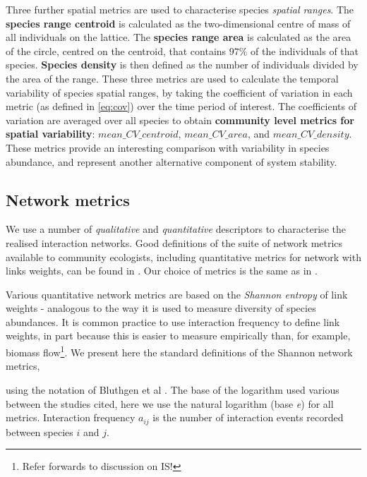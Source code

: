 Three further spatial metrics are used to characterise species \emph{spatial ranges}. The \textbf{species range centroid} is calculated as the two-dimensional centre of mass of all individuals on the lattice. The \textbf{species range area} is calculated as the area of the circle, centred on the centroid, that contains $97\%$ of the individuals of that species. \textbf{Species density} is then defined as the number of individuals divided by the area of the range. These three metrics are used to calculate the temporal variability of species spatial ranges, by taking the coefficient of variation in each metric (as defined in \eqref{eq:cov}) over the time period of interest. The coefficients of variation are averaged over all species to obtain \textbf{community level metrics for spatial variability}: $mean\_CV\_centroid$, $mean\_CV\_area$, and $mean\_CV\_density$. These metrics provide an interesting comparison with variability in species abundance, and represent another alternative component of system stability.


\subsection{Network metrics}
\label{sec:define_network_metrics}

We use a number of \emph{qualitative} and \emph{quantitative} descriptors to characterise the realised interaction networks. Good definitions of the suite of network metrics available to community ecologists, including quantitative metrics for network with links weights, can be found in \cite{}. Our choice of metrics is the same as in \cite{lurgi2015effects}.


Various quantitative network metrics are based on the \emph{Shannon entropy} of link weights - analogous to the way it is used to measure diversity of species abundances. It is common practice to use interaction frequency to define link weights, in part because this is easier to measure empirically than, for example, biomass flow\footnote{Refer forwards to discussion on IS!}. We present here the standard definitions of the Shannon network metrics, 



using the notation of Bluthgen et al \cite{bluthgen2008interaction}. The base of the logarithm used various between the studies cited, here we use the natural logarithm (base \emph{e}) for all metrics. 
 Interaction frequency $a_{ij}$ is the number of interaction events recorded between species $i$ and $j$. 

